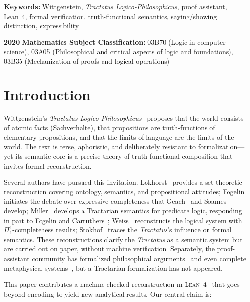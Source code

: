 \documentclass[10pt, letterpaper]{article}
\theoremstyle{definition}
\theoremstyle{remark}
\newcommand{\Lean}{\textsc{Lean}}
\begin{document}
\medskip
\noindent
\textbf{Keywords:} Wittgenstein, \emph{Tractatus Logico-Philosophicus},
proof assistant, Lean~4, formal verification, truth-functional
semantics, saying/showing distinction, expressibility

\medskip
\noindent
\textbf{2020 Mathematics Subject Classification:}
03B70 (Logic in computer science),
03A05 (Philosophical and critical aspects of logic and foundations),
03B35 (Mechanization of proofs and logical operations)

\section{Introduction}
\label{sec:intro}

Wittgenstein's \emph{Tractatus Logico-Philosophicus}~\cite{wittgenstein1921}
proposes that the world consists of atomic facts (Sachverhalte),
that propositions are truth-functions of elementary propositions,
and that the limits of language are the limits of the world.
The text is terse, aphoristic, and deliberately resistant to
formalization---yet its semantic core is a precise theory of
truth-functional composition that invites formal reconstruction.

Several authors have pursued this invitation.
Lokhorst~\cite{lokhorst1988} provides a set-theoretic
reconstruction covering ontology, semantics, and propositional
attitudes;
Fogelin~\cite{fogelin1987} initiates the debate over expressive
completeness that Geach~\cite{geach1981} and
Soames~\cite{soames1983} develop;
Miller~\cite{miller1995} develops a Tractarian semantics for
predicate logic, responding in part to Fogelin and
Carruthers~\cite{carruthers1989};
Weiss~\cite{weiss2017} reconstructs the logical system with
$\Pi^1_1$-completeness results;
Stokhof~\cite{stokhof2008} traces the \emph{Tractatus}'s
influence on formal semantics.
These reconstructions clarify the \emph{Tractatus} as a semantic
system but are carried out on paper, without machine verification.
Separately, the proof-assistant community has formalized
philosophical arguments~\cite{benzmuller2017,fitelson2007} and
even complete metaphysical systems~\cite{scherf2025}, but a
Tractarian formalization has not appeared.

This paper contributes a machine-checked reconstruction in
\Lean~4~\cite{moura2021} that goes beyond encoding to yield new
analytical results.  Our central claim is:
\end{document}

